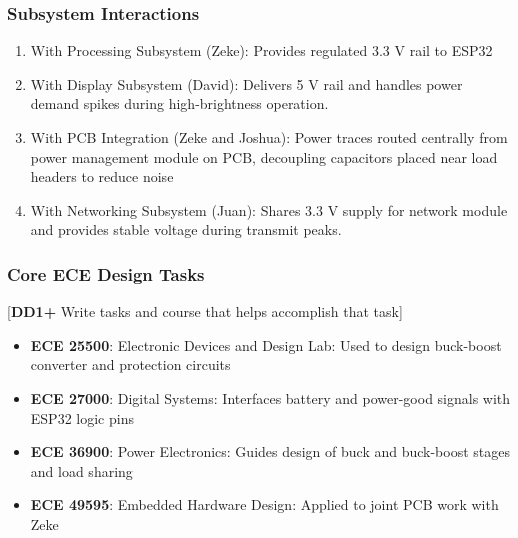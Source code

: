 \subsubsection{Subsystem Interactions}
\begin{enumerate}
    \item {With Processing Subsystem (Zeke): Provides regulated 3.3 V rail to ESP32}
    \item {With Display Subsystem (David): Delivers 5 V rail and handles power demand spikes during high-brightness operation.}
    \item {With PCB Integration (Zeke and Joshua): Power traces routed centrally from power management module on PCB, decoupling capacitors placed near load headers to reduce noise}
    \item {With Networking Subsystem (Juan): Shares 3.3 V supply for network module and provides stable voltage during transmit peaks.}
\end{enumerate}

\subsubsection{Core ECE Design Tasks}
[\textbf{DD1+} Write tasks and course that helps accomplish that task]
\begin{itemize}
    \item \textbf{ECE 25500}: Electronic Devices and Design Lab: Used to design buck-boost converter and protection circuits
    \item \textbf{ECE 27000}: Digital Systems: Interfaces battery and power-good signals with ESP32 logic pins
    \item \textbf{ECE 36900}: Power Electronics: Guides design of buck and buck-boost stages and load sharing
    \item \textbf{ECE 49595}: Embedded Hardware Design: Applied to joint PCB work with Zeke
\end{itemize}

